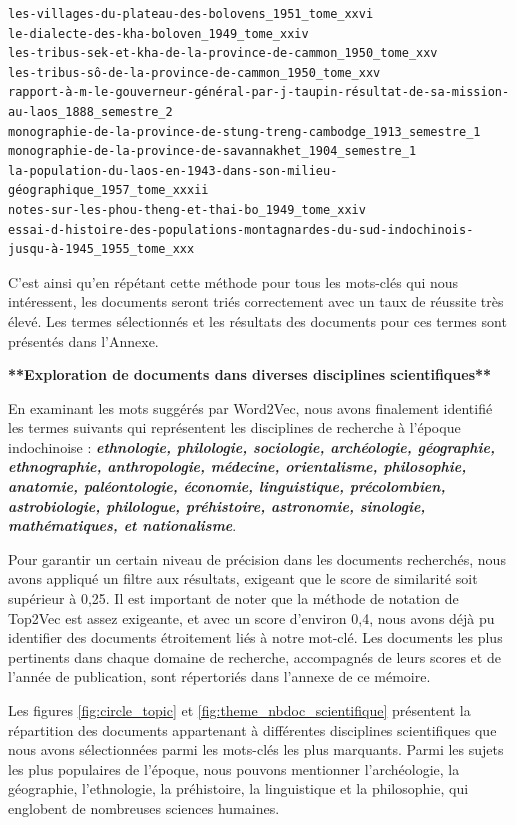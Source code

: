 \begin{lstlisting}
les-villages-du-plateau-des-bolovens_1951_tome_xxvi
le-dialecte-des-kha-boloven_1949_tome_xxiv
les-tribus-sek-et-kha-de-la-province-de-cammon_1950_tome_xxv
les-tribus-sô-de-la-province-de-cammon_1950_tome_xxv
rapport-à-m-le-gouverneur-général-par-j-taupin-résultat-de-sa-mission-au-laos_1888_semestre_2
monographie-de-la-province-de-stung-treng-cambodge_1913_semestre_1
monographie-de-la-province-de-savannakhet_1904_semestre_1
la-population-du-laos-en-1943-dans-son-milieu-géographique_1957_tome_xxxii
notes-sur-les-phou-theng-et-thai-bo_1949_tome_xxiv
essai-d-histoire-des-populations-montagnardes-du-sud-indochinois-jusqu-à-1945_1955_tome_xxx
\end{lstlisting}

C'est ainsi qu'en répétant cette méthode pour tous les mots-clés qui nous intéressent, les documents seront triés correctement avec un taux de réussite très élevé. Les termes sélectionnés et les résultats des documents pour ces termes sont présentés dans l'Annexe.

\textbf{**Exploration de documents dans diverses disciplines scientifiques**}

En examinant les mots suggérés par Word2Vec, nous avons finalement identifié les termes suivants qui représentent les disciplines de recherche à l'époque indochinoise : \textbf{\textit{ethnologie, philologie, sociologie, archéologie, géographie, ethnographie, anthropologie, médecine, orientalisme, philosophie, anatomie, paléontologie, économie, linguistique, précolombien, astrobiologie, philologue, préhistoire, astronomie, sinologie, mathématiques, et nationalisme}}. 

Pour garantir un certain niveau de précision dans les documents recherchés, nous avons appliqué un filtre aux résultats, exigeant que le score de similarité soit supérieur à 0,25. Il est important de noter que la méthode de notation de Top2Vec est assez exigeante, et avec un score d'environ 0,4, nous avons déjà pu identifier des documents étroitement liés à notre mot-clé. Les documents les plus pertinents dans chaque domaine de recherche, accompagnés de leurs scores et de l'année de publication, sont répertoriés dans l'annexe de ce mémoire.

Les figures \ref{fig:circle_topic} et \ref{fig:theme_nbdoc_scientifique} présentent la répartition des documents appartenant à différentes disciplines scientifiques que nous avons sélectionnées parmi les mots-clés les plus marquants. Parmi les sujets les plus populaires de l'époque, nous pouvons mentionner l'archéologie, la géographie, l'ethnologie, la préhistoire, la linguistique et la philosophie, qui englobent de nombreuses sciences humaines.


